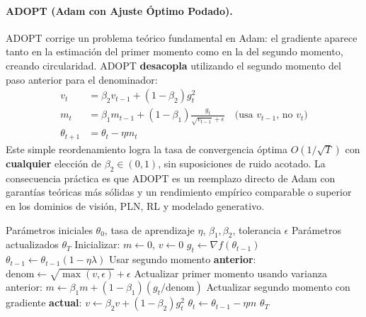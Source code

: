 \documentclass[11pt,a4paper]{article}
\begin{document}
\paragraph{ADOPT (Adam con Ajuste Óptimo Podado).}
ADOPT corrige un problema teórico fundamental en Adam: el gradiente aparece tanto en la estimación del primer momento como en la del segundo momento, creando circularidad. ADOPT \textbf{desacopla} utilizando el segundo momento del paso anterior para el denominador:
\begin{align}
v_t &= \beta_2 v_{t-1} + (1-\beta_2)g_t^2 \\
m_t &= \beta_1 m_{t-1} + (1-\beta_1)\frac{g_t}{\sqrt{v_{t-1}}+\epsilon} \quad\text{(usa $v_{t-1}$, no $v_t$)} \\
\theta_{t+1} &= \theta_t - \eta m_t
\end{align}
Este simple reordenamiento logra la tasa de convergencia óptima $O(1/\sqrt{T})$ con \textbf{cualquier} elección de $\beta_2 \in (0,1)$, sin suposiciones de ruido acotado. La consecuencia práctica es que ADOPT es un reemplazo directo de Adam con garantías teóricas más sólidas y un rendimiento empírico comparable o superior en los dominios de visión, PLN, RL y modelado generativo.

\begin{algorithm}[H]
\caption{ADOPT (Adam con Ajuste Óptimo Podado)}
\label{alg:adopt}
\begin{algorithmic}[1]
\Require Parámetros iniciales $\theta_0$, tasa de aprendizaje $\eta$, $\beta_1, \beta_2$, tolerancia $\epsilon$
\Ensure Parámetros actualizados $\theta_T$
\State Inicializar: $m \gets 0$, $v \gets 0$
    \State $g_t \gets \nabla f(\theta_{t-1})$
        \State $\theta_{t-1} \gets \theta_{t-1}(1 - \eta\lambda)$
    \EndIf
    \State Usar segundo momento \textbf{anterior}: $\text{denom} \gets \sqrt{\max(v, \epsilon)} + \epsilon$
    \State Actualizar primer momento usando varianza anterior: $m \gets \beta_1 m + (1-\beta_1)(g_t / \text{denom})$
    \State Actualizar segundo momento con gradiente \textbf{actual}: $v \gets \beta_2 v + (1-\beta_2) g_t^2$
    \State $\theta_t \gets \theta_{t-1} - \eta m$
\EndFor
\Return $\theta_T$
\end{algorithmic}
\end{algorithm}
\end{document}
